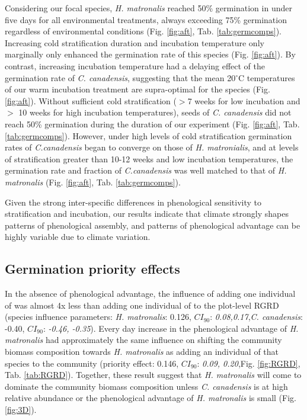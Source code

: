 \documentclass{article}[11pt]
\begin{document}
Considering our focal species, \textit{H. matronalis} reached 50\% germination in under five days for all environmental treatments, always exceeding 75\% germination regardless of environmental conditions (Fig. \ref{fig:aft}, Tab. \ref{tab:germcomps}). Increasing cold stratification duration and incubation temperature only marginally only enhanced the germination rate of this species (Fig. \ref{fig:aft}). By contrast, increasing incubation temperature had a delaying effect of the germination rate of \textit{C. canadensis}, suggesting that the mean 20$^{\circ}$C temperatures of our warm incubation treatment are supra-optimal for the species (Fig. \ref{fig:aft}). Without sufficient cold stratification ($>$7 weeks for low incubation and $>$ 10 weeks for high incubation temperatures), seeds of  \textit{C. canadensis} did not reach 50\% germination during the duration of our experiment (Fig. \ref{fig:aft}, Tab. \ref{tab:germcomps}). However, under high levels of cold stratification germination rates of \textit{C.canadensis} began to converge on those of \textit{H. matronialis}, and at levels of stratification greater than 10-12 weeks and low incubation temperatures, the germination rate and fraction of \textit{C.canadensis} was well matched to that of \textit{H. matronalis} (Fig. \ref{fig:aft}, Tab. \ref{tab:germcomps}).

Given the strong inter-specific differences in phenological sensitivity to stratification and incubation, our results indicate that climate strongly shapes patterns of phenological assembly, and patterns of phenological advantage can be highly variable due to climate variation.

\subsection*{Germination priority effects}
In the absence of phenological advantage, the influence of adding one individual of  was almost 4x less than adding one individual of  to the plot-level RGRD (species influence parameters:  \textit{H. matronalis}: 0.126, $CI_{90}$: \textit{0.08,0.17},\textit{C. canadensis}: -0.40, $CI_{90}$: \textit{-0.46, -0.35}). Every day increase in the phenological advantage of \textit{ H. matronalis} had approximately the same influence on shifting the community biomass composition towards \textit{H. matronalis} as adding an individual of that species to the community (priority effect: 0.146, $CI_{90}$: \textit{0.09, 0.20},Fig. \ref{fig:RGRD}, Tab. \ref{tab:RGRD}). Together, these result suggest that \textit{H. matronalis} will come to dominate the community biomass composition unless \textit{C. canadensis} is at high relative abundance or the phenological advantage of \textit{H. matronalis} is small (Fig. \ref{fig:3D}).
\end{document}
